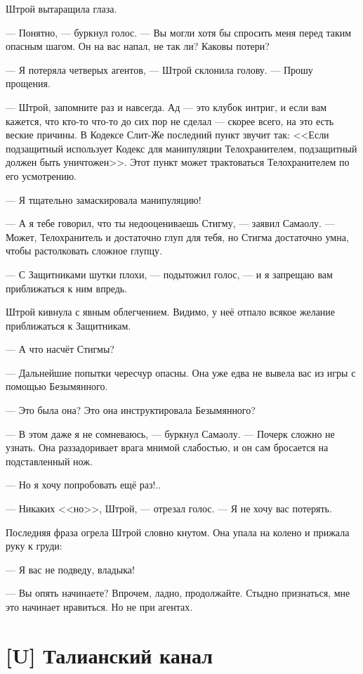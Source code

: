 Штрой вытаращила глаза.

--- Понятно, --- буркнул голос.
--- Вы могли хотя бы спросить меня перед таким опасным шагом.
Он на вас напал, не так ли?
Каковы потери?

--- Я потеряла четверых агентов, --- Штрой склонила голову.
--- Прошу прощения.

--- Штрой, запомните раз и навсегда.
Ад --- это клубок интриг, и если вам кажется, что кто-то что-то до сих пор не сделал --- скорее всего, на это есть веские причины.
В Кодексе Слит-Же последний пункт звучит так: <<Если подзащитный использует Кодекс для манипуляции Телохранителем, подзащитный должен быть уничтожен>>.
Этот пункт может трактоваться Телохранителем по его усмотрению.

--- Я тщательно замаскировала манипуляцию!

--- А я тебе говорил, что ты недооцениваешь Стигму, --- заявил Самаолу.
--- Может, Телохранитель и достаточно глуп для тебя, но Стигма достаточно умна, чтобы растолковать сложное глупцу.

--- С Защитниками шутки плохи, --- подытожил голос, --- и я запрещаю вам приближаться к ним впредь.

Штрой кивнула с явным облегчением.
Видимо, у неё отпало всякое желание приближаться к Защитникам.

--- А что насчёт Стигмы?

--- Дальнейшие попытки чересчур опасны.
Она уже едва не вывела вас из игры с помощью Безымянного.

--- Это была она?
Это она инструктировала Безымянного?

--- В этом даже я не сомневаюсь, --- буркнул Самаолу.
--- Почерк сложно не узнать.
Она раззадоривает врага мнимой слабостью, и он сам бросается на подставленный нож.

--- Но я хочу попробовать ещё раз!..

--- Никаких <<но>>, Штрой, --- отрезал голос.
--- Я не хочу вас потерять.

Последняя фраза огрела Штрой словно кнутом.
Она упала на колено и прижала руку к груди:

--- Я вас не подведу, владыка!

--- Вы опять начинаете?
Впрочем, ладно, продолжайте.
Стыдно признаться, мне это начинает нравиться.
Но не при агентах.

\textspace

\section{[U] Талианский канал}

